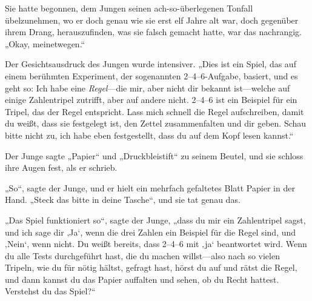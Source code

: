Sie hatte begonnen, dem Jungen seinen ach-so-überlegenen Tonfall übelzunehmen, wo er doch genau wie sie erst elf Jahre alt war, doch gegenüber ihrem Drang, herauszufinden, was sie falsch gemacht hatte, war das nachrangig. „Okay, meinetwegen.“

Der Gesichtsausdruck des Jungen wurde intensiver. „Dies ist ein Spiel, das auf einem berühmten Experiment, der sogenannten 2–4–6-Aufgabe, basiert, und es geht so: Ich habe eine \emph{Regel}—die mir, aber nicht dir bekannt ist—welche auf einige Zahlentripel zutrifft, aber auf andere nicht. 2–4–6 ist ein Beispiel für ein Tripel, das der Regel entspricht. Lass mich schnell die Regel aufschreiben, damit du weißt, dass sie festgelegt ist, den Zettel zusammenfalten und dir geben. Schau bitte nicht zu, ich habe eben festgestellt, dass du auf dem Kopf lesen kannst.“

Der Junge sagte „Papier“ und „Druckbleistift“ zu seinem Beutel, und sie schloss ihre Augen fest, als er schrieb.

„So“, sagte der Junge, und er hielt ein mehrfach gefaltetes Blatt Papier in der Hand. „Steck das bitte in deine Tasche“, und sie tat genau das.

„Das Spiel funktioniert so“, sagte der Junge, „dass du mir ein Zahlentripel sagst, und ich sage dir ‚Ja‘, wenn die drei Zahlen ein Beispiel für die Regel sind, und ‚Nein‘, wenn nicht. Du weißt bereits, dass 2–4–6 mit ‚ja‘ beantwortet wird. Wenn du alle Tests durchgeführt hast, die du machen willst—also nach so vielen Tripeln, wie du für nötig hältst, gefragt hast, hörst du auf und rätst die Regel, und dann kannst du das Papier auffalten und sehen, ob du Recht hattest. Verstehst du das Spiel?“

